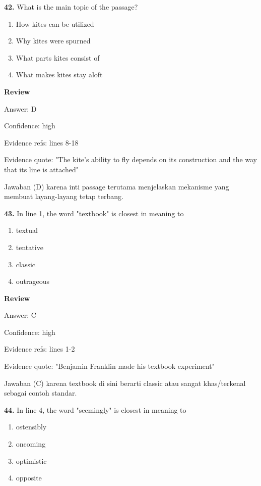 \documentclass[12pt]{article}
\begin{document}
\endgroup
\medskip
\noindent\textbf{42.} What is the main topic of the passage?
\begin{enumerate}[label=(\Alph*),leftmargin=*,itemsep=0.2em]
\item How kites can be utilized
\item Why kites were spurned
\item What parts kites consist of
\item What makes kites stay aloft
\end{enumerate}
\par
\begingroup
\setlength{\parskip}{0pt}
\setlength{\parindent}{0pt}
\textbf{Review}\par
Answer: D\par
Confidence: high\par
Evidence refs: lines 8-18\par
Evidence quote: "The kite's ability to fly depends on its construction and the way that its line is attached"\par
Jawaban (D) karena inti passage terutama menjelaskan mekanisme yang membuat layang-layang tetap terbang.\par
\endgroup
\par
\vspace{0.25\baselineskip}
\noindent\textbf{43.} In line 1, the word "textbook" is closest in meaning to
\begin{enumerate}[label=(\Alph*),leftmargin=*,itemsep=0.2em]
\item textual
\item tentative
\item classic
\item outrageous
\end{enumerate}
\par
\begingroup
\setlength{\parskip}{0pt}
\setlength{\parindent}{0pt}
\textbf{Review}\par
Answer: C\par
Confidence: high\par
Evidence refs: lines 1-2\par
Evidence quote: "Benjamin Franklin made his textbook experiment"\par
Jawaban (C) karena textbook di sini berarti classic atau sangat khas/terkenal sebagai contoh standar.\par
\endgroup
\par
\vspace{0.25\baselineskip}
\noindent\textbf{44.} In line 4, the word "seemingly" is closest in meaning to
\begin{enumerate}[label=(\Alph*),leftmargin=*,itemsep=0.2em]
\item ostensibly
\item oncoming
\item optimistic
\item opposite
\end{enumerate}
\end{document}
